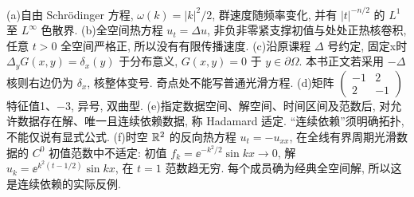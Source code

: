 \begin{solution}
(a)自由 Schrödinger 方程, $\omega(k)=|k|^2/2$, 群速度随频率变化, 并有 $|t|^{-n/2}$ 的 $L^1$ 至 $L^\infty$ 色散界.
(b)全空间热方程 $u_t=\Delta u$, 非负非零紧支撑初值与处处正热核卷积, 任意 $t>0$ 全空间严格正, 所以没有有限传播速度.
(c)沿原课程 $\Delta$ 号约定, 固定x时 $\Delta_yG(x,y)=\delta_x(y)$ 于分布意义, $G(x,y)=0$ 于 $y\in\partial\Omega$. 本书正文若采用 $-\Delta$ 核则右边仍为 $\delta_x$, 核整体变号. 奇点处不能写普通光滑方程.
(d)矩阵 $\left(\begin{smallmatrix}-1&2\\2&-1\end{smallmatrix}\right)$ 特征值1、$-3$, 异号, 双曲型.
(e)指定数据空间、解空间、时间区间及范数后, 对允许数据存在解、唯一且连续依赖数据, 称 Hadamard 适定. “连续依赖”须明确拓扑, 不能仅说有显式公式.
(f)时空 $\mathbb R^2$ 的反向热方程 $u_t=-u_{xx}$, 在全线有界周期光滑数据的 $C^0$ 初值范数中不适定: 初值 $f_k=\ee^{-k^2/2}\sin kx\to0$, 解 $u_k=\ee^{k^2(t-1/2)}\sin kx$, 在 $t=1$ 范数趋无穷. 每个成员确为经典全空间解, 所以这是连续依赖的实际反例.
\end{solution}

